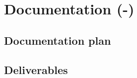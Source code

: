 
\section{Documentation (-)}
\label{sec:documentation}
\subsection{Documentation plan}
\lipsum[1]
\subsection{Deliverables}
\lipsum[1]